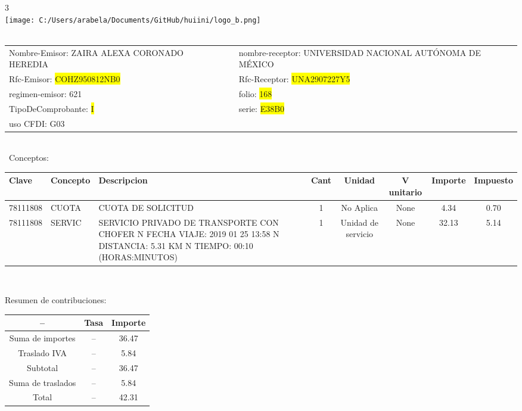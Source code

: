 \documentclass{article}
\begin{document}
\hspace{18cm} 3\\
\texttt{[image: C:/Users/arabela/Documents/GitHub/huiini/logo\_b.png]}
\bigskip\\\
\begin{tabular}{p{11cm}p{1cm}p{8cm}}

Nombre-Emisor: ZAIRA ALEXA CORONADO HEREDIA && nombre-receptor: UNIVERSIDAD NACIONAL AUTÓNOMA DE MÉXICO\\

Rfc-Emisor: \colorbox{yellow}{ COHZ950812NB0 } & & Rfc-Receptor: \colorbox{yellow}{ UNA2907227Y5 }\\

regimen-emisor: 621 & & folio: \colorbox{yellow}{ 168 }\\

TipoDeComprobante: \colorbox{yellow}{ I } & & serie: \colorbox{yellow}{ E38B0 }\\

uso CFDI: G03\\



\end{tabular}
\bigskip\bigskip\bigskip\\\
Conceptos:\\
\begin{tabular}{|p{1.5cm}|p{3.6cm}|p{3.6cm}|c|c|c|c|c|}
\hline
Clave & Concepto & Descripcion & Cant & Unidad & V unitario & Importe & Impuesto \\
\hline

78111808 & CUOTA  & CUOTA DE SOLICITUD & 1 & No Aplica & None & 4.34 &  0.70 \\
\hline

78111808 & SERVIC & SERVICIO PRIVADO DE TRANSPORTE CON CHOFER  N FECHA VIAJE: 2019 01 25 13:58  N DISTANCIA: 5.31 KM  N TIEMPO: 00:10 (HORAS:MINUTOS) & 1 & Unidad de servicio & None & 32.13 &  5.14 \\
\hline

\end{tabular}\\
\bigskip
\begin{center}
Resumen de contribuciones:\\
\bigskip
\begin{tabular}{|c|c|c|}
\hline
 -- & Tasa & Importe\\
\hline

Suma de importes & -- & 36.47 \\
\hline

Traslado IVA & -- & 5.84 \\
\hline

Subtotal  & -- & 36.47 \\
\hline

Suma de traslados & -- & 5.84 \\
\hline

Total  & -- & 42.31 \\
\hline

\end{tabular}
\end{center}
\end{document}
